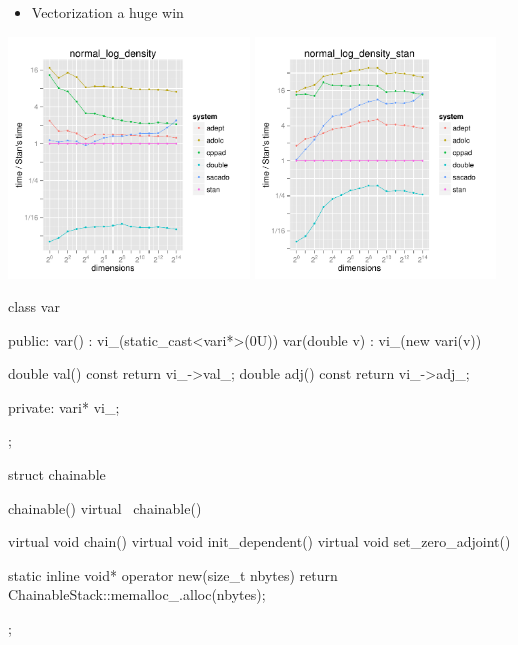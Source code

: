\documentclass[10pt]{report}
\begin{document}
%
\begin{itemize}
\item Vectorization a huge win
\end{itemize}
\vspace*{-8pt}
\hfill \hfill
\includegraphics[width=0.48\textwidth]{img/normal_log_density_rel_eval.pdf}
\hfill
\includegraphics[width=0.48\textwidth]{img/normal_log_density_stan_rel_eval.pdf}
\hfill \hfill




\begin{stancode}
class var {
public:
  var() : vi_(static_cast<vari*>(0U)) { }
  var(double v) : vi_(new vari(v)) { }

  double val() const { return vi_->val_; }
  double adj() const { return vi_->adj_; }  

private:
  vari* vi_;
};
\end{stancode}


%
\begin{stancode}
struct chainable {
  chainable() { }
  virtual ~chainable() { }

  virtual void chain() { }
  virtual void init_dependent() { }
  virtual void set_zero_adjoint() { }

  static inline void* operator new(size_t nbytes) {
    return ChainableStack::memalloc_.alloc(nbytes);
  }
};
\end{stancode}
\end{document}
